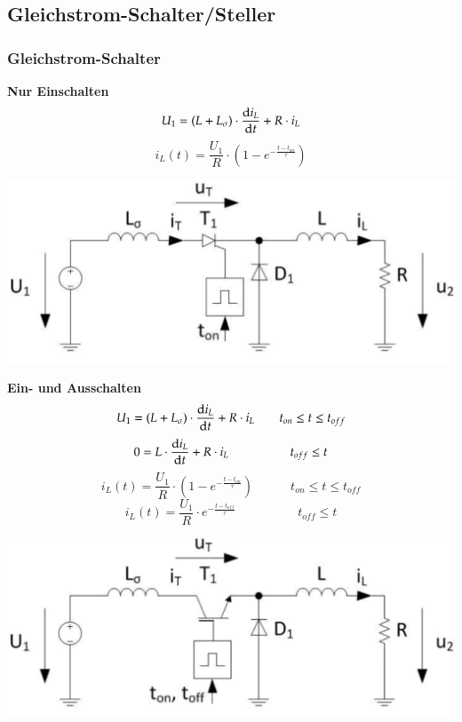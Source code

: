 \subsection{Gleichstrom-Schalter/Steller}
\subsubsection{Gleichstrom-Schalter}
\begin{minipage}{0.5\linewidth}
    \textbf{Nur Einschalten}\newline
    \[ U_1=(L + L_{\sigma})\cdot \frac{\mathop{}\!\mathrm{d} i_L}{\mathop{}\!\mathrm{d} t}+R\cdot i_L \]
    \[ i_L(t)=\frac{U_1}{R}\cdot(1-e^{-\frac{t-t_{on}}{\tau}})\]
\end{minipage}
\begin{minipage}{0.4\linewidth}
    \includegraphics[width=1.2\linewidth]{images/GsSchalterOn}
\end{minipage}

\begin{minipage}{0.5\linewidth}
\textbf{Ein- und Ausschalten}\newline
\[ U_1=(L + L_{\sigma})\cdot \frac{\mathop{}\!\mathrm{d} i_L}{\mathop{}\!\mathrm{d} t}+R\cdot i_L \qquad t_{on} \leq t \leq t_{off}\]
\[ 0=L\cdot \frac{\mathop{}\!\mathrm{d} i_L}{\mathop{}\!\mathrm{d} t}+ R\cdot i_L \qquad \qquad \quad t_{off}\leq t \]
\[ i_L(t)=\frac{U_1}{R}\cdot(1-e^{-\frac{t-t_{on}}{\tau}}) \qquad \quad t_{on} \leq t \leq t_{off}\]
\[ i_L(t)=\frac{U_1}{R}\cdot e^{-\frac{t-t_{off}}{\tau}} \qquad \quad \qquad t_{off}\leq t \]
\end{minipage}
\begin{minipage}{0.4\linewidth}
    \includegraphics[width=1.2\linewidth]{images/GsSchalterOnOff}
\end{minipage}


